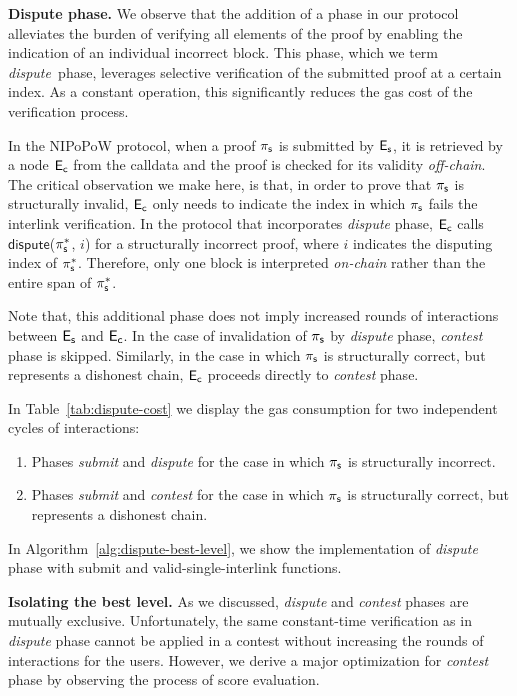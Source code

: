

\newcommand{\dispute}{\emph{dispute\ }} \noindent \textbf{Dispute phase.} We
observe that the addition of a phase in our protocol alleviates the burden of
verifying all elements of the proof by enabling the indication of an individual
incorrect block. This phase, which we term \dispute phase, leverages selective
verification of the submitted proof at a certain index. As a constant
operation, this significantly reduces the gas cost of the verification process.

In the NIPoPoW protocol, when a proof $\mathsf{\pi_{s}}$ is submitted by $\mathsf{E_{s}}$, it is
retrieved by a node $\mathsf{E_{c}}$ from the calldata and the proof is checked for its
validity \emph{off-chain}. The critical observation we make here, is that, in
order to prove that $\mathsf{\pi_{s}}$ is structurally invalid, $\mathsf{E_{c}}$ only needs to
indicate the index in which $\mathsf{\pi_{s}}$ fails the interlink verification. In the
protocol that incorporates \emph{dispute} phase, $\mathsf{E_{c}}$ calls
$\textsf{dispute}$($\mathsf{\pi_{s}^*}$, $i$) for a structurally incorrect proof, where $i$
indicates the disputing index of $\mathsf{\pi_{s}^*}$. Therefore, only one block is
interpreted \emph{on-chain} rather than the entire span of $\mathsf{\pi_{s}^*}$.

Note that, this additional phase does not imply increased rounds of
interactions between $\mathsf{E_{s}}$ and $\mathsf{E_{c}}$. In the case of invalidation of $\mathsf{\pi_{s}}$
by \emph{dispute} phase, \emph{contest} phase is skipped. Similarly, in the
case in which $\mathsf{\pi_{s}}$ is structurally correct, but represents a dishonest
chain, $\mathsf{E_{c}}$ proceeds directly to \emph{contest} phase.

In Table~\ref{tab:dispute-cost} we display the gas consumption for
two independent cycles of interactions:
\begin{enumerate}
    \item Phases \emph{submit} and \emph{dispute} for the case in which $\mathsf{\pi_{s}}$
is structurally incorrect.
    \item Phases \emph{submit} and \emph{contest} for the case in which
$\mathsf{\pi_{s}}$ is structurally correct, but represents a dishonest chain.
\end{enumerate}
\noindent
In Algorithm~\ref{alg:dispute-best-level}, we show the implementation of
\emph{dispute} phase with \textsf{submit} and \textsf{valid-single-interlink}
functions.



\noindent \textbf{Isolating the best level.} As we discussed, \emph{dispute}
and \emph{contest} phases are mutually exclusive. Unfortunately, the same
constant-time verification as in \emph{dispute} phase cannot be applied in a
contest without increasing the rounds of interactions for the users. However,
we derive a major optimization for \emph{contest} phase by observing the
process of score evaluation.


